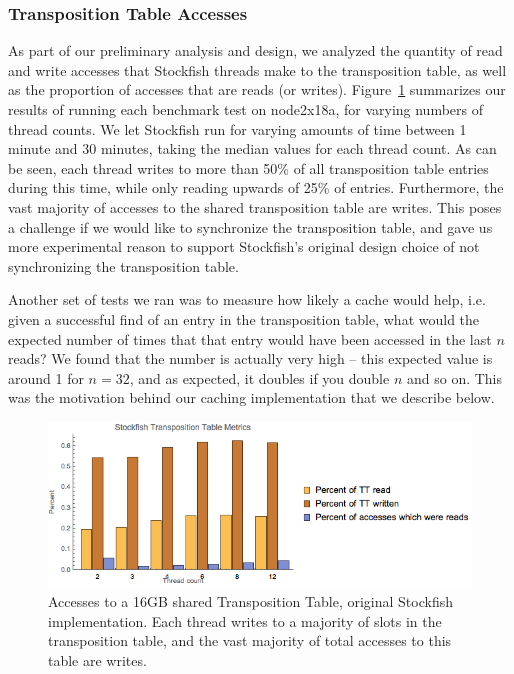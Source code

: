 \documentclass{article}
\begin{document}
\subsubsection{Transposition Table Accesses}
As part of our preliminary analysis and design, we analyzed the quantity of
read and write accesses that Stockfish threads make to the transposition table, as well as
the proportion of accesses that are reads (or writes). Figure~\ref{fig:accesses} summarizes
our results of running each benchmark test on node2x18a, for varying numbers of
thread counts. We let Stockfish run for varying amounts of time between 1
minute and 30 minutes, taking the median values for each thread count. As can be
seen, each thread writes to more than 50\% of all transposition table entries during
this time, while only reading upwards of 25\% of entries. Furthermore, the vast
majority of accesses to the shared transposition table are writes. This poses a
challenge if we would like to synchronize the transposition table, and gave us
more experimental reason to support Stockfish's original design choice of not
synchronizing the transposition table.

Another set of tests we ran was to measure how likely a cache would help, i.e.
given a successful find of an entry in the transposition table, what would the
expected number of times that that entry would have been accessed in the last
$n$ reads? We found that the number is actually very high -- this expected
value is around 1 for $n = 32$, and as expected, it doubles if you double $n$
and so on. This was the motivation behind our caching implementation that we
describe below.

\begin{figure}
	\includegraphics[width=\textwidth]{../plots/TTmetrics}
	\caption{Accesses to a 16GB shared Transposition Table, original Stockfish
	implementation. Each thread writes to a majority of slots in the
	transposition table, and the vast majority of total accesses to this
	table are writes.}
	\label{fig:accesses}
\end{figure}
\end{document}
